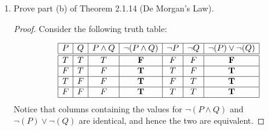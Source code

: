 \documentclass[12pt]{article}
\begin{document}
\begin{enumerate}
\begin{proof}

\begin{displaymath} 
\begin{array}{|c|c|c|c|c|c|c|}\hline
    P & Q & R & Q \wedge R & P\wedge(Q\wedge R) & Q \vee R & P\wedge(Q\vee R)\\\hline\hline
    T & T & T & T & \mathbf{T} & T & \mathbf{T}\\\hline
    F & T & T & T & \mathbf{F} & T & \mathbf{F}\\\hline
    T & F & T & F & \mathbf{F} & T & \mathbf{T}\\\hline
    F & F & T & F & \mathbf{F} & T & \mathbf{F}\\\hline
    T & T & F & F & \mathbf{F} & T & \mathbf{T}\\\hline
    F & T & F & F & \mathbf{F} & T & \mathbf{F}\\\hline
    T & F & F & F & \mathbf{F} & F & \mathbf{F}\\\hline
    F & F & F & F & \mathbf{F} & F & \mathbf{F}\\\hline
\end{array}
\end{displaymath}
Both logical statements are similar in that they depend on the value of $P$ for the final truth value. The interior parts are the opposite, with one requiring a disjunction and the other a conjunction. These values, in columns 4 and 6, are inverse of each other. Because both are then in a conjunction with $P$, the outcome does not remain inverse. 
\end{proof}

\item Prove part (b) of Theorem 2.1.14 (De Morgan's Law).

\begin{proof}
Consider the following truth table:

\begin{displaymath} 
\begin{array}{|c|c|c|c|c|c|c|}\hline
    P & Q  & P \wedge Q & \neg(P \wedge Q) & \neg P & \neg Q & \neg(P)\vee \neg(Q)\\\hline\hline
    T & T  & T & \mathbf{F} & F & F & \mathbf{F}\\\hline
    F & T  & F & \mathbf{T} & T & F & \mathbf{T}\\\hline
    T & F  & F & \mathbf{T} & F & T & \mathbf{T}\\\hline
    F & F  & F & \mathbf{T} & T & T & \mathbf{T}\\\hline
\end{array}
\end{displaymath}
Notice that columns containing the values for $\neg(P \wedge Q)$ and $\neg(P)\vee \neg(Q)$ are identical, and hence the two are equivalent. 

\end{proof}

\end{enumerate}
\end{document}
